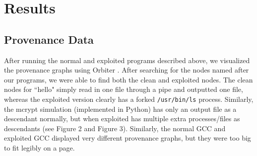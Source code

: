 \documentclass[10pt,twocolumn]{article}
\begin{document}
\section{Results}
\subsection{Provenance Data}
After running the normal and exploited programs described above, we visualized the provenance graphs using Orbiter \cite{orbiter}. After searching for the nodes named after our programs, we were able to find both the clean and exploited nodes. The clean nodes for ``hello" simply read in one file through a pipe and outputted one file, whereas the exploited version clearly has a forked \texttt{/usr/bin/ls} process. Similarly, the mcrypt simulation (implemented in Python) has only an output file as a descendant normally, but when exploited has multiple extra processes/files as descendants (see Figure 2 and Figure 3). Similarly, the normal GCC and exploited GCC displayed very different provenance graphs, but they were too big to fit legibly on a page.
\end{document}
